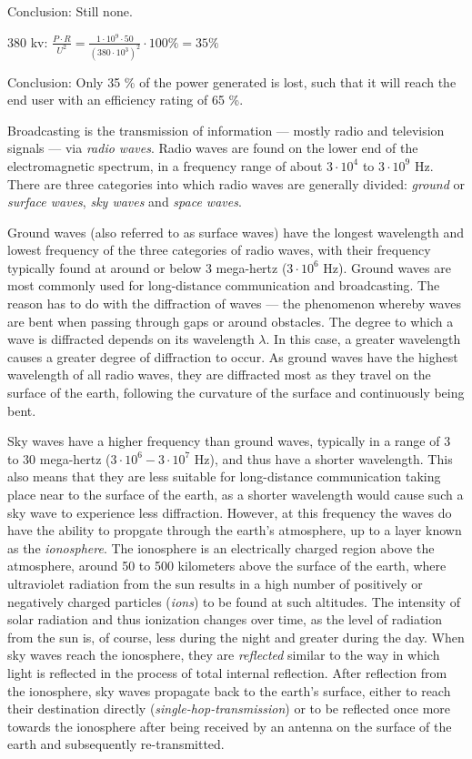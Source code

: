 Conclusion: Still none.

380 kv: $\frac{P \cdot R}{U^2} = \frac{1 \cdot 10^9 \cdot 50}{(380 \cdot 10^3)^2} \cdot 100\% = 35 \%$ 

Conclusion: Only 35 \% of the power generated is lost, such that it will reach the end user with an efficiency rating of 65 \%.


Broadcasting is the transmission of information --- mostly radio and television signals --- via \emph{radio waves}. Radio waves are found on the lower end of the electromagnetic spectrum, in a frequency range of about $3 \cdot 10^4$ to $3 \cdot 10^9$ Hz. There are three categories into which radio waves are generally divided: \emph{ground} or \emph{surface waves}, \emph{sky waves} and \emph{space waves}. 


Ground waves (also referred to as surface waves) have the longest wavelength and lowest frequency of the three categories of radio waves, with their frequency typically found at around or below 3 mega-hertz ($3 \cdot 10^6$ Hz). Ground waves are most commonly used for long-distance communication and broadcasting. The reason has to do with the diffraction of waves --- the phenomenon whereby waves are bent when passing through gaps or around obstacles. The degree to which a wave is diffracted depends on its wavelength $\lambda$. In this case, a greater wavelength causes a greater degree of diffraction to occur. As ground waves have the highest wavelength of all radio waves, they are diffracted most as they travel on the surface of the earth, following the curvature of the surface and continuously being bent.


Sky waves have a higher frequency than ground waves, typically in a range of 3 to 30 mega-hertz ($3 \cdot 10^6 - 3 \cdot 10^7$ Hz), and thus have a shorter wavelength. This also means that they are less suitable for long-distance communication taking place near to the surface of the earth, as a shorter wavelength would cause such a sky wave to experience less diffraction. However, at this frequency the waves do have the ability to propgate through the earth's atmosphere, up to a layer known as the \emph{ionosphere}. The ionosphere is an electrically charged region above the atmosphere, around 50 to 500 kilometers above the surface of the earth, where ultraviolet radiation from the sun results in a high number of positively or negatively charged particles (\emph{ions}) to be found at such altitudes. The intensity of solar radiation and thus ionization changes over time, as the level of radiation from the sun is, of course, less during the night and greater during the day. When sky waves reach the ionosphere, they are \emph{reflected} similar to the way in which light is reflected in the process of total internal reflection. After reflection from the ionosphere, sky waves propagate back to the earth's surface, either to reach their destination directly (\emph{single-hop-transmission}) or to be reflected once more towards the ionosphere after being received by an antenna on the surface of the earth and subsequently re-transmitted. 

